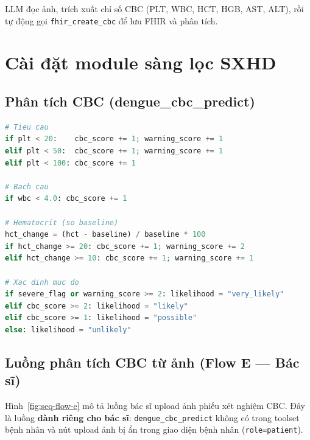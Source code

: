 \documentclass[oneside, a4paper]{book}
\theoremstyle{plain}
\theoremstyle{plain}
\theoremstyle{definition}
\theoremstyle{remark}
\begin{document}
LLM đọc ảnh, trích xuất chỉ số CBC (PLT, WBC, HCT, HGB, AST, ALT), rồi tự động gọi \texttt{fhir\_create\_cbc} để lưu FHIR và phân tích.

\section{Cài đặt module sàng lọc SXHD}

\subsection{Phân tích CBC (dengue\_cbc\_predict)}

\begin{lstlisting}[language=Python, caption={Logic đánh giá mức độ nguy cơ từ CBC}]
# Tieu cau
if plt < 20:    cbc_score += 1; warning_score += 1
elif plt < 50:  cbc_score += 1; warning_score += 1
elif plt < 100: cbc_score += 1

# Bach cau
if wbc < 4.0: cbc_score += 1

# Hematocrit (so baseline)
hct_change = (hct - baseline) / baseline * 100
if hct_change >= 20: cbc_score += 1; warning_score += 2
elif hct_change >= 10: cbc_score += 1; warning_score += 1

# Xac dinh muc do
if severe_flag or warning_score >= 2: likelihood = "very_likely"
elif cbc_score >= 2: likelihood = "likely"
elif cbc_score >= 1: likelihood = "possible"
else: likelihood = "unlikely"
\end{lstlisting}

\subsection{Luồng phân tích CBC từ ảnh (Flow E --- Bác sĩ)}

Hình~\ref{fig:seq-flow-e} mô tả luồng bác sĩ upload ảnh phiếu xét nghiệm CBC. Đây là luồng \textbf{dành riêng cho bác sĩ}: \texttt{dengue\_cbc\_predict} không có trong toolset bệnh nhân và nút upload ảnh bị ẩn trong giao diện bệnh nhân (\texttt{role=patient}).
\end{document}
